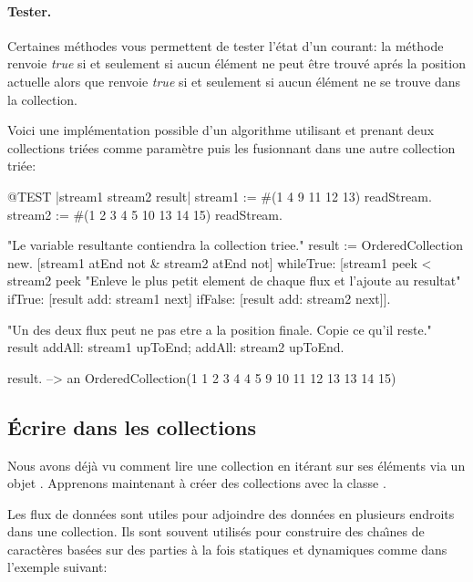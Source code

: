 \documentclass[a4paper,10pt,twoside]{book}
\begin{document}
\paragraph{Tester.} Certaines m\'ethodes vous permettent de tester l'\'etat d'un \stream courant: 
la m\'ethode  renvoie \emph{true} si et seulement si aucun \'el\'ement ne peut \^etre trouv\'e apr\'es la position actuelle alors que  renvoie \emph{true} si et seulement si aucun \'el\'ement ne se trouve dans la collection.

Voici une impl\'ementation possible d'un algorithme utilisant  et prenant deux collections tri\'ees comme param\`etre puis les fusionnant dans une autre collection tri\'ee:

\begin{code}{@TEST |stream1 stream2 result|}
stream1 := #(1 4 9 11 12 13) readStream.
stream2 := #(1 2 3 4 5 10 13 14 15) readStream.

"Le variable resultante contiendra la collection triee."
result := OrderedCollection new.
[stream1 atEnd not & stream2 atEnd not]
  whileTrue: [stream1 peek < stream2 peek
    "Enleve le plus petit element de chaque flux et l'ajoute au resultat"
    ifTrue: [result add: stream1 next]
    ifFalse: [result add: stream2 next]].

"Un des deux flux peut ne pas etre a la position finale. Copie ce qu'il reste."
result
  addAll: stream1 upToEnd;
  addAll: stream2 upToEnd.

result. -->   an OrderedCollection(1 1 2 3 4 4 5 9 10 11 12 13 13 14 15)
\end{code}

\subsection{\'Ecrire dans les collections}

Nous avons d\'ej\`a vu comment lire une collection en it\'erant sur ses
\'el\'ements via un objet . Apprenons maintenant \`a cr\'eer
des collections avec la classe .

Les flux de donn\'ees  sont utiles pour adjoindre des donn\'ees en plusieurs endroits dans une collection. Ils sont souvent utilis\'es pour construire des cha\^{\i}nes de caract\`eres bas\'ees sur des parties \`a la fois statiques et dynamiques comme dans l'exemple suivant:
\end{document}
